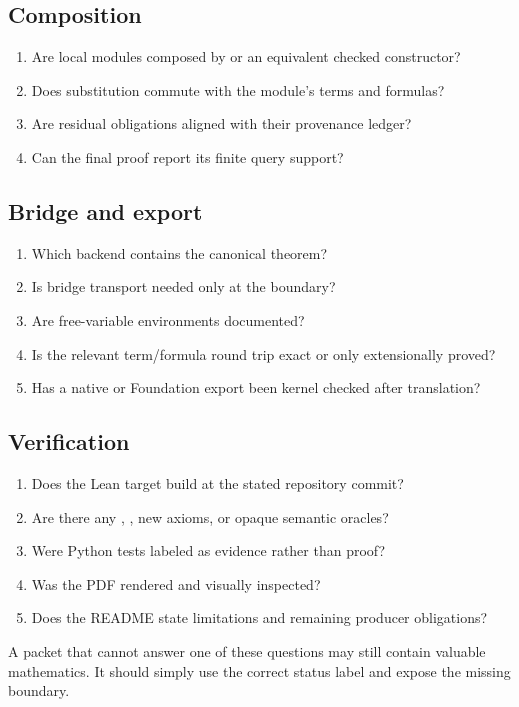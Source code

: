 \subsection*{Composition}

\begin{enumerate}
\item Are local modules composed by  or an equivalent checked
constructor?
\item Does substitution commute with the module's terms and formulas?
\item Are residual obligations aligned with their provenance ledger?
\item Can the final proof report its finite query support?
\end{enumerate}

\subsection*{Bridge and export}

\begin{enumerate}
\item Which backend contains the canonical theorem?
\item Is bridge transport needed only at the boundary?
\item Are free-variable environments documented?
\item Is the relevant term/formula round trip exact or only extensionally
proved?
\item Has a native or Foundation export been kernel checked after translation?
\end{enumerate}

\subsection*{Verification}

\begin{enumerate}
\item Does the Lean target build at the stated repository commit?
\item Are there any , , new axioms, or opaque semantic
oracles?
\item Were Python tests labeled as evidence rather than proof?
\item Was the PDF rendered and visually inspected?
\item Does the README state limitations and remaining producer obligations?
\end{enumerate}

A packet that cannot answer one of these questions may still contain valuable
mathematics.  It should simply use the correct status label and expose the
missing boundary.
